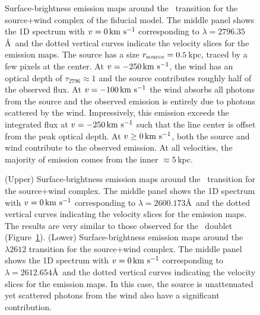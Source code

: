\documentclass[12pt,preprint]{aastex}
\begin{document}
\begin{figure}
\caption{
Surface-brightness emission maps around the \mgiia\ transition for the
source+wind complex of the fiducial model.  The middle panel shows the
1D spectrum with $v=0 
\, {\rm km~s^{-1}}$ corresponding to $\lambda = 2796.35$\AA\ and the dotted vertical
curves indicate the velocity slices for the emission maps.  The
source has a size $r_{\rm source} = 0.5$\,kpc, traced by a few
pixels at the center.   At $v=-250 \, {\rm km~s^{-1}}$, the wind has an optical
depth of $\tau_{2796} \approx 1$ and the source contributes
roughly half of the observed flux.  At $v=-100 \, {\rm km~s^{-1}}$ the
wind absorbs all photons from the source and the observed emission is
entirely due to photons scattered by the wind.  Impressively, this
emission exceeds the integrated flux at $v = -250\, {\rm km~s^{-1}}$ such that the
line center is offset from the peak optical depth.  At $v \ge 0
\, {\rm km~s^{-1}}$,  both the source and wind contribute to the observed emission.
At all velocities, the majority of emission comes from the inner
$\approx 5$\,kpc.
}
\label{fig:fiducial_ifu_mgii}
\end{figure}

\begin{figure}
\caption{
(Upper) Surface-brightness emission maps around the \feiib\ transition for the
source+wind complex.  The middle panel shows the 1D spectrum with $v=0
\, {\rm km~s^{-1}}$ corresponding to $\lambda = 2600.173$\AA\ and the dotted vertical
curves indicating the velocity slices for the emission maps.  
The results are very similar to those observed for the \mgiid\ doublet
(Figure~\ref{fig:fiducial_ifu_mgii}).
(Lower) Surface-brightness emission maps around the ~$\lambda
2612$ transition for the 
source+wind complex.  The middle panel shows the 1D spectrum with $v=0
\, {\rm km~s^{-1}}$ corresponding to $\lambda = 2612.654$\AA\ and the dotted vertical
curves indicating the velocity slices for the emission maps.  
In this case, the source is unattenuated yet scattered photons from
the wind also have a significant contribution. 
}
\label{fig:fiducial_ifu_feii}
\end{figure}

\end{document}
